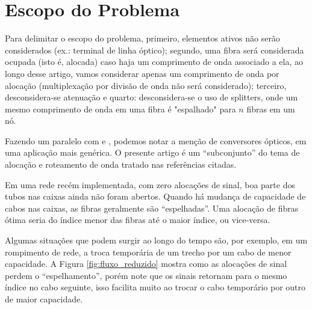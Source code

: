 \section{Escopo do Problema} \label{sec:problem}

Para delimitar o escopo do problema, primeiro, elementos ativos não serão
considerados (ex.: terminal de linha óptico); segundo, uma fibra será
considerada ocupada (isto é, alocada) caso haja um comprimento de onda
associado a ela, ao longo desse artigo, vamos considerar apenas um comprimento
de onda por alocação (multiplexação por divisão de onda não será considerado);
terceiro, desconsidera-se atenuação e quarto: desconsidera-se o uso de
splitters, onde um mesmo comprimento de onda em uma fibra é "espalhado" para
$n$ fibras em um nó.

Fazendo um paralelo com \cite{artigorwa} e \cite{zang2000review}, podemos notar
a menção de conversores ópticos, em uma aplicação mais genérica. O presente
artigo é um \enquote{subconjunto} do tema de
alocação e roteamento de onda tratado nas referências citadas.

Em uma rede recém implementada, com zero alocações de sinal, boa parte dos tubos 
nas caixas ainda não foram abertos. Quando há mudança de capacidade de cabos nas
caixas, as fibras geralmente são \enquote{espelhadas}. Uma alocação de fibras ótima
seria do índice menor das fibras até o maior índice, ou vice-versa.

Algumas situações que podem surgir ao longo do tempo são, por exemplo, em um
rompimento de rede, a troca temporária de um trecho por um cabo de menor 
capacidade. A Figura \ref{fig:fluxo_reduzido} mostra como as alocações de sinal
perdem o \enquote{espelhamento}, porém note que os sinais retornam para o mesmo índice
no cabo seguinte, isso facilita muito ao trocar o cabo temporário por outro de
maior capacidade.

